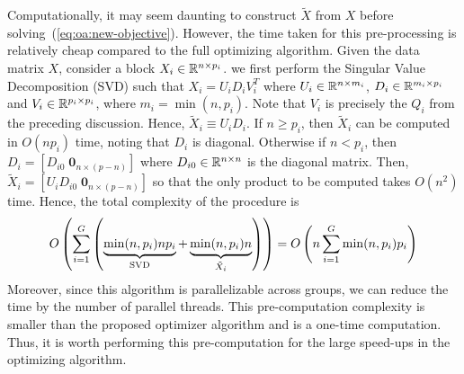 Computationally, it may seem daunting to 
construct $\tilde{X}$ from $X$ before solving~(\ref{eq:oa:new-objective}).
However, the time taken for this pre-processing is relatively cheap compared to the full optimizing algorithm.
Given the data matrix $X$, consider a block $X_i \in \mathbb{R}^{n \times p_i}$.
we first perform the Singular Value Decomposition (SVD) such that
$X_i = U_iD_iV_i^T$ where $U_i \in \mathbb{R}^{n \times m_i}$, $D_i \in \mathbb{R}^{m_i \times p_i}$ and $V_i \in \mathbb{R}^{p_i \times p_i}$,
where $m_i = \min(n,p_i)$.
Note that $V_i$ is precisely the $Q_i$ from the preceding discussion.
Hence, $\tilde{X}_i \equiv U_i D_i$.
If $n \geq p_i$, then $\tilde{X}_i$ can be computed in $O(n p_i)$ time, noting that $D_i$ is diagonal.
Otherwise if $n < p_i$, then $D_i = [D_{i0} \; \textbf{0}_{n\times (p-n)}]$ where $D_{i0} \in \mathbb{R}^{n \times n}$ is the diagonal matrix.
Then, $\tilde{X}_i = [U_i D_{i0} \; \textbf{0}_{n \times (p-n)}]$ so that the only product to be computed takes $O(n^2)$ time.
Hence, the total complexity of the procedure is
\begin{align*}
    O\left(
        \sum\limits_{i=1}^G
        \left(\underbrace{\min(n,p_i) n p_i}_{\mathrm{SVD}} + \underbrace{\min(n, p_i) n}_{\tilde{X}_i}\right)
    \right)
    =
    O\left(
        n
        \sum\limits_{i=1}^G
        \min(n,p_i) p_i
    \right)
\end{align*}
Moreover, since this algorithm is parallelizable across groups,
we can reduce the time by the number of parallel threads.
This pre-computation complexity is smaller than the proposed optimizer algorithm
and is a one-time computation.
Thus, it is worth performing this pre-computation for the large speed-ups in the optimizing algorithm.

